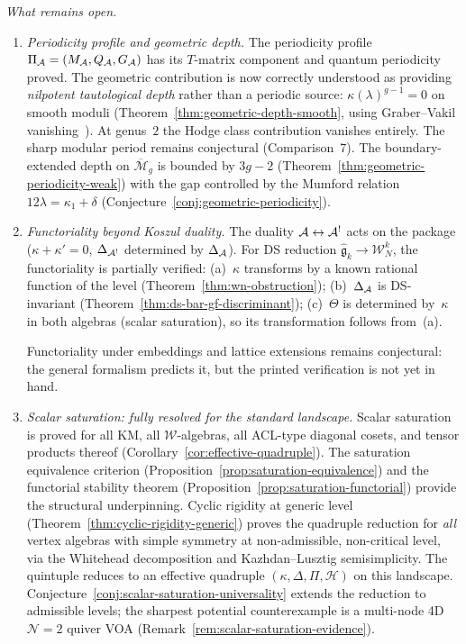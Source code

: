\emph{What remains open.}
\begin{enumerate}[label=\textup{(\roman*)},start=3]
\item \emph{Periodicity profile and geometric depth.}
  The periodicity profile $\Pi_{\mathcal{A}} = (M_{\mathcal{A}}, Q_{\mathcal{A}},
  G_{\mathcal{A}})$ has its $T$-matrix component and quantum periodicity
  proved.  The geometric contribution is now correctly understood
  as providing \emph{nilpotent tautological depth} rather than a
  periodic source: $\kappa(\lambda)^{g-1} = 0$ on smooth moduli
  (Theorem~\ref{thm:geometric-depth-smooth}, using Graber--Vakil
  vanishing~\cite{GraVak05}).  At genus~$2$ the Hodge class
  contribution vanishes entirely.  The sharp modular period remains
  conjectural (Comparison~7).  The boundary-extended depth on
  $\overline{\mathcal{M}}_g$ is bounded by $3g - 2$
  (Theorem~\ref{thm:geometric-periodicity-weak}) with the
  gap controlled by the Mumford relation $12\lambda = \kappa_1 + \delta$
  (Conjecture~\ref{conj:geometric-periodicity}).

\item \emph{Functoriality beyond Koszul duality.}
  The duality $\mathcal{A} \leftrightarrow \mathcal{A}^!$ acts on the package
  ($\kappa + \kappa' = 0$, $\Delta_{\mathcal{A}^!}$ determined by
  $\Delta_{\mathcal{A}}$).  For DS reduction
  $\widehat{\mathfrak{g}}_k \to \mathcal{W}_N^k$, the
  functoriality is partially verified:
  (a)~$\kappa$ transforms by a known rational function of the level
  (Theorem~\ref{thm:wn-obstruction});
  (b)~$\Delta_{\mathcal{A}}$ is DS-invariant
  (Theorem~\ref{thm:ds-bar-gf-discriminant});
  (c)~$\Theta$ is determined by~$\kappa$ in both algebras (scalar
  saturation), so its transformation follows from~(a).

  Functoriality under embeddings and lattice extensions remains
  conjectural: the general formalism predicts it, but the printed
  verification is not yet in hand.

\item \emph{Scalar saturation: fully resolved for the standard
  landscape.}
  Scalar saturation is proved for all KM, all $\mathcal{W}$-algebras,
  all ACL-type diagonal cosets, and tensor products thereof
  (Corollary~\ref{cor:effective-quadruple}).
  The saturation equivalence criterion
  (Proposition~\ref{prop:saturation-equivalence}) and the
  functorial stability theorem
  (Proposition~\ref{prop:saturation-functorial}) provide the
  structural underpinning.
  Cyclic rigidity at generic level
  (Theorem~\ref{thm:cyclic-rigidity-generic}) proves the
  quadruple reduction for \emph{all} vertex algebras with
  simple symmetry at non-admissible, non-critical level, via
  the Whitehead decomposition and Kazhdan--Lusztig
  semisimplicity.
  The quintuple reduces to an effective quadruple
  $(\kappa, \Delta, \Pi, \mathcal{H})$ on this landscape.
  Conjecture~\ref{conj:scalar-saturation-universality}
  extends the reduction to admissible levels; the sharpest
  potential counterexample is a
  multi-node 4D $\mathcal{N}=2$ quiver VOA
  (Remark~\ref{rem:scalar-saturation-evidence}).
\end{enumerate}


